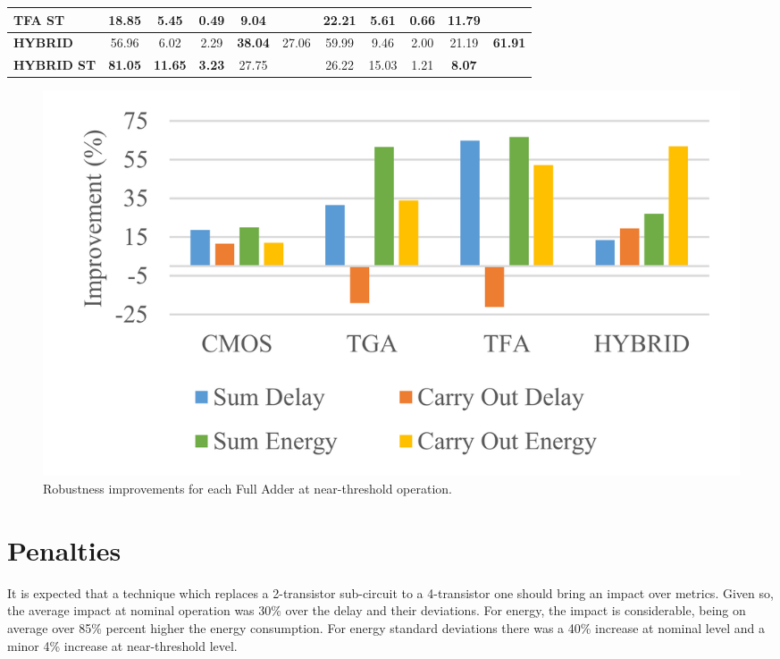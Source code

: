 \documentclass[ecp,tc, english]{iiufrgs}
\begin{document}
\begin{table}[H]
{\begin{tabular}{|l|c|c|c|c|c|c|c|c|c|c|}
\textbf{TFA ST}                            & 18.85          & 5.45           & \textbf{0.49} & \textbf{9.04}  &                                 & \textbf{22.21} & 5.61           & 0.66          & 11.79          &                                 \\ \hline
\textbf{HYBRID}                            & 56.96          & 6.02           & 2.29          & \textbf{38.04} & \multirow{2}{*}{27.06}          & 59.99          & 9.46           & 2.00          & 21.19          & \multirow{2}{*}{\textbf{61.91}} \\ \cline{1-5} \cline{7-10}
\textbf{HYBRID ST}                         & \textbf{81.05} & \textbf{11.65} & \textbf{3.23} & 27.75          &                                 & 26.22          & 15.03          & 1.21          & \textbf{8.07}  &                                 \\ \hline
\end{tabular}%
}
\end{table}

\begin{figure}[H]
\centering
\includegraphics[width=\textwidth]{NTimprov.png}
\caption{Robustness improvements for each Full Adder at near-threshold operation.}
\label{fig:NTimprov}
\end{figure}

\section{Penalties}

It is expected that a technique which replaces a 2-transistor sub-circuit to a 4-transistor one should bring an impact over metrics. Given so, the average impact at nominal operation was 30\% over the delay and their deviations. For energy, the impact is considerable, being on average over 85\% percent higher the energy consumption. For energy standard deviations there was a 40\% increase at nominal level and a minor 4\% increase at near-threshold level.
\end{document}
